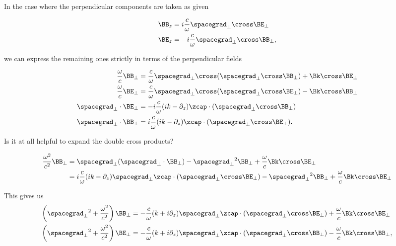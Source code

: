 In the case where the perpendicular components are taken as given

\begin{align}\label{eqn:relativisticElectrodynamicsT4:n}
\BB_z &= i \frac{ c  }{\omega} \spacegrad_\perp \cross \BE_\perp \\
\BE_z &= -i \frac{ c  }{\omega} \spacegrad_\perp \cross \BB_\perp,
\end{align}

we can express the remaining ones strictly in terms of the perpendicular fields

\begin{align}\label{eqn:relativisticElectrodynamicsT4:n}
\frac{\omega}{c} \BB_\perp &= \frac{c}{\omega} \spacegrad_\perp \cross (\spacegrad_\perp \cross \BB_\perp) + \Bk \cross \BE_\perp \\
\frac{\omega}{c} \BE_\perp &= \frac{c}{\omega} \spacegrad_\perp \cross (\spacegrad_\perp \cross \BE_\perp) - \Bk \cross \BB_\perp \\
\spacegrad_\perp \cdot \BE_\perp &= -i \frac{c}{\omega} (i k - \partial_z) \zcap \cdot (\spacegrad_\perp \cross \BB_\perp) \\
\spacegrad_\perp \cdot \BB_\perp &= i \frac{c}{\omega} (i k - \partial_z) \zcap \cdot (\spacegrad_\perp \cross \BE_\perp).
\end{align}

Is it at all helpful to expand the double cross products?

\begin{align*}
\frac{\omega^2}{c^2} \BB_\perp 
&= 
\spacegrad_\perp (\spacegrad_\perp \cdot \BB_\perp) -{\spacegrad_\perp}^2 \BB_\perp + \frac{\omega}{c} \Bk \cross \BE_\perp \\
&= 
i \frac{c}{\omega}
(i k - \partial_z)
\spacegrad_\perp \zcap \cdot (\spacegrad_\perp \cross \BE_\perp)
-{\spacegrad_\perp}^2 \BB_\perp + \frac{\omega}{c} \Bk \cross \BE_\perp 
\end{align*}

This gives us
\begin{align}\label{eqn:relativisticElectrodynamicsT4:n}
\left( {\spacegrad_\perp}^2 + \frac{\omega^2}{c^2} \right) \BB_\perp 
&= - \frac{c}{\omega} (k + i\partial_z) \spacegrad_\perp \zcap \cdot (\spacegrad_\perp \cross \BE_\perp) + \frac{\omega}{c} \Bk \cross \BE_\perp \\
\left( {\spacegrad_\perp}^2 + \frac{\omega^2}{c^2} \right) \BE_\perp 
&= -\frac{c}{\omega} (k + i\partial_z) \spacegrad_\perp \zcap \cdot (\spacegrad_\perp \cross \BB_\perp) - \frac{\omega}{c} \Bk \cross \BB_\perp,
\end{align}

